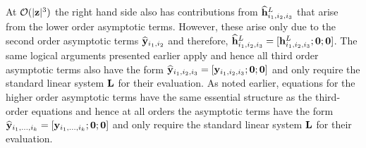 At $\mathcal{O}(|\mathbf{z}|^{3})$ the right hand side also has contributions from $\widehat{\mathbf{h}}^{L}_{i_{1},i_{2},i_{3}}$ that arise from the lower order asymptotic terms. However, these arise only due to the second order asymptotic terms $\widehat{\mathbf{y}}_{i_{1},i_{2}}$ and therefore, $\widehat{\mathbf{h}}^{L}_{i_{1},i_{2},i_{3}} = [\mathbf{h}^{L}_{i_{1},i_{2},i_{3}}; \mathbf{0}; \mathbf{0}]$. The same logical arguments presented earlier apply and hence all third order asymptotic terms also have the form $\widehat{\mathbf{y}}_{i_{1},i_{2},i_{3}} = [\mathbf{y}_{i_{1},i_{2},i_{3}}; \mathbf{0}; \mathbf{0}]$ and only require the standard linear system $\mathbf{L}$ for their evaluation. As noted earlier, equations for the higher order asymptotic terms have the same essential structure as the third-order equations and hence at all orders the asymptotic terms have the form $\widehat{\mathbf{y}}_{i_{1},\ldots,i_{k}} = [\mathbf{y}_{i_{1},\ldots,i_{k}}; \mathbf{0}; \mathbf{0}]$ and only require the standard linear system $\mathbf{L}$ for their evaluation. 

